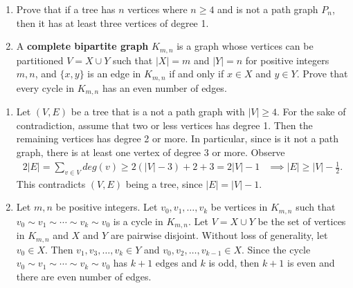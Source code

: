\documentclass{article}
\theoremstyle{definition}
\begin{document}
\begin{question}
\begin{enumerate}
	\item Prove that if a tree has $n$ vertices where $n\geq 4$ and is not a path graph $P_n$, then it has at least three vertices of degree 1.
	\item A \textbf{complete bipartite graph} $K_{m,n}$ is a graph whose vertices can be partitioned $V=X\cup Y$ such that $|X|=m$ and  $|Y|=n$ for positive integers $m,n$, and $\{x, y\}$ is an edge in $K_{m,n}$ if and only if $x\in X$ and $y\in Y$. Prove that every cycle in $K_{m, n}$ has an even number of edges.
	\end{enumerate}
\end{question}
\begin{solution}
\begin{enumerate}
	\item Let $(V, E)$ be a tree that is a not a path graph with $|V|\geq 4$. For the sake of contradiction, assume that two or less vertices has degree 1. Then the remaining vertices has degree 2 or more. In particular, since is it not a path graph, there is at least one vertex of degree 3 or more. Observe
	\begin{align*}
	2|E| = \sum_{v\in V} deg(v) \geq 2(|V|-3) + 2 + 3  = 2|V| -1&\implies |E| \geq |V| - \frac{1}{2}.
	\end{align*}
	This contradicts $(V, E)$ being a tree, since $|E|=|V|-1$.
	\item Let $m, n$ be positive integers. Let $v_0, v_1, \dots, v_k$ be vertices in $K_{m, n}$ such that $v_0\sim v_1\sim \cdots\sim v_k\sim v_0$ is a cycle in $K_{m,n}$. Let $V=X\cup Y$ be the set of vertices in $K_{m, n}$ and $X$ and $Y$ are pairwise disjoint. Without loss of generality, let $v_0\in X$. Then $v_1, v_3, \dots, v_k\in Y$ and $v_0, v_2, \dots, v_{k-1}\in X$. Since the cycle $v_0\sim v_1\sim \cdots\sim v_k\sim v_0$ has $k+1$ edges and $k$ is odd, then $k+1$ is even and there are even number of edges.
\end{enumerate}
\end{solution}
\end{document}
